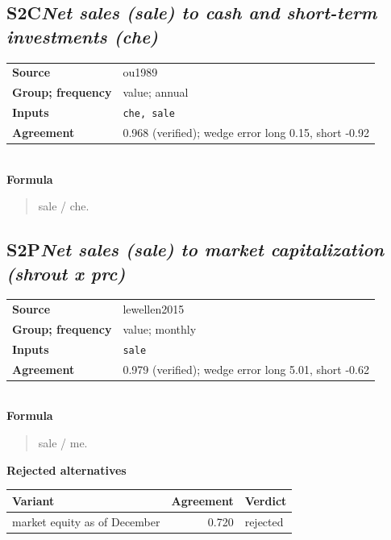 \documentclass[11pt]{article}
\begin{document}
\subsection*{S2C\quad\normalfont\itshape Net sales (sale) to cash and short-term investments (che)}
\begin{tabular}{@{}p{3.3cm}p{12.3cm}@{}}
\textbf{Source} & ou1989\\
\textbf{Group; frequency} & value; annual\\
\textbf{Inputs} & \texttt{che, sale}\\
\textbf{Agreement} & 0.968 (verified); wedge error long 0.15, short -0.92\\
\end{tabular}\\[4pt]
\textbf{Formula}
\begin{quote}\small
sale / che.\\

\end{quote}
\subsection*{S2P\quad\normalfont\itshape Net sales (sale) to market capitalization (shrout x prc)}
\begin{tabular}{@{}p{3.3cm}p{12.3cm}@{}}
\textbf{Source} & lewellen2015\\
\textbf{Group; frequency} & value; monthly\\
\textbf{Inputs} & \texttt{sale}\\
\textbf{Agreement} & 0.979 (verified); wedge error long 5.01, short -0.62\\
\end{tabular}\\[4pt]
\textbf{Formula}
\begin{quote}\small
sale / me.\\

\end{quote}
\textbf{Rejected alternatives}\\[2pt]
{\small\begin{longtable}{@{}p{9.6cm}rp{4.3cm}@{}}
\toprule Variant & Agreement & Verdict\\\midrule\endhead
market equity as of December & 0.720 & rejected\\
\bottomrule\end{longtable}}
\end{document}
